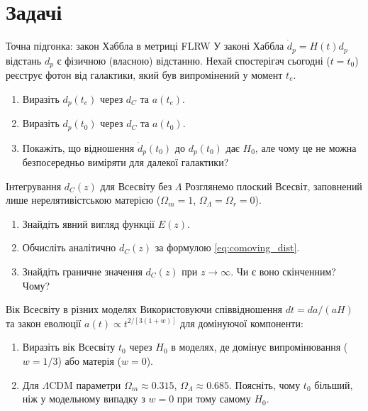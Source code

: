 \section*{Задачі}

\begin{problem}{Точна підгонка: закон Хаббла в метриці FLRW}
    У законі Хаббла $\dot{d}_p = H(t) d_p$ відстань $d_p$ є фізичною
    (власною) відстанню. Нехай спостерігач сьогодні ($t=t_0$) реєструє
    фотон від галактики, який був випромінений у момент $t_e$.
    \begin{enumerate}
        \item Виразіть $d_p(t_e)$ через $d_C$ та $a(t_e)$.
        \item Виразіть $d_p(t_0)$ через $d_C$ та $a(t_0)$.
        \item Покажіть, що відношення $\dot{d}_p(t_0)$ до $d_p(t_0)$
              дає $H_0$, але чому це не можна безпосередньо виміряти
              для далекої галактики?
    \end{enumerate}
\end{problem}

\begin{problem}{Інтегрування $d_C(z)$ для Всесвіту без $\Lambda$}
    Розглянемо плоский Всесвіт, заповнений лише нерелятивістською
    матерією ($\Omega_m = 1$, $\Omega_\Lambda = \Omega_r = 0$).
    \begin{enumerate}
        \item Знайдіть явний вигляд функції $E(z)$.
        \item Обчисліть аналітично $d_C(z)$ за формулою \eqref{eq:comoving_dist}.
        \item Знайдіть граничне значення $d_C(z)$ при $z \to \infty$.
              Чи є воно скінченним? Чому?
    \end{enumerate}
\end{problem}

\begin{problem}{Вік Всесвіту в різних моделях}
    Використовуючи співвідношення $dt = da/(aH)$ та закон еволюції
    $a(t) \propto t^{2/[3(1+w)]}$ для домінуючої компоненти:
    \begin{enumerate}
        \item Виразіть вік Всесвіту $t_0$ через $H_0$ в моделях, де
              домінує випромінювання ($w=1/3$) або матерія ($w=0$).
        \item Для $\Lambda$CDM параметри $\Omega_m \approx 0.315$, $\Omega_\Lambda \approx 0.685$.
              Поясніть, чому $t_0$ більший, ніж у модельному випадку
              з $w=0$ при тому самому $H_0$.
    \end{enumerate}
\end{problem}

